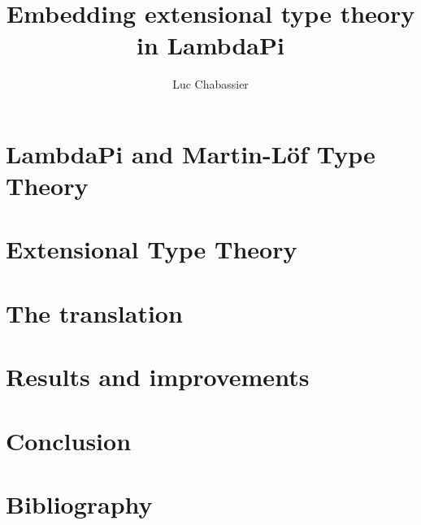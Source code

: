 \documentclass[11pt]{article}
\title{Embedding extensional type theory in LambdaPi}
\author{Luc Chabassier}
\begin{document}
\frenchspacing

\maketitle
\tableofcontents



\section{LambdaPi and Martin-Löf Type Theory}\label{MLTT}


\section{Extensional Type Theory}\label{ETT}


\section{The translation}\label{translation}

\section{Results and improvements}\label{results}

\section{Conclusion}\label{conclusion}

\section*{Bibliography}


\end{document}
